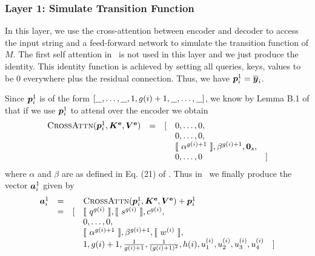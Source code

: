 \subsubsection{Layer 1: Simulate Transition Function}


In this layer, we use the cross-attention between encoder and decoder to access the 
input string and  a feed-forward network to simulate the transition function of $M$.
The first self attention in~ is not used in this layer and 
we just produce the identity.
This identity function is achieved by setting all queries, keys, values to be 0 
everywhere plus the residual connection.
Thus, we have  ${{\bm{p}}}^1_i=\overline{{\bm{y}}}_i$.


Since ${\bm{p}}^1_i$ is of the form $[\lu,\ldots,\lu,1,g(i)+1,\lu,\ldots,\lu]$, we know
by Lemma B.1 of \citet{Perez19} that if we use ${\bm{p}}^1_i$ to attend over the encoder we obtain
\begin{equation*}\label{eq:first-layer2}
\begin{array}{rcllr}
\textsc{CrossAttn}({\bm{p}}^1_i,{\bm{K}}^{\textbf{e}},{\bm{V}}^{\textbf{e}}) & = & [ 
& 0,\ldots,0, \\
&&& 0,\ldots,0, \\
&&& \llbracket\ \alpha^{g(i)+1}\ \rrbracket,\beta^{g(i)+1},{\bm{0}}_s, \\
&&& 0,\ldots,0 & ] 
\end{array}
\end{equation*}
where $\alpha$ and $\beta$ are as defined in Eq. (21) of \citep{Perez19}.
Thus in~ we finally produce the vector ${\bm{a}}^1_i$ given by
\begin{equation}\label{eq:ai_1}
\begin{array}{rcllr}
{\bm{a}}^1_{i} & = &&
\textsc{CrossAttn}({\bm{p}}^1_i,{\bm{K}}^{\textbf{e}},{\bm{V}}^{\textbf{e}}) + {\bm{p}}^1_i \\ 
& = & [ 
& \llbracket\ q^{g(i)}\ \rrbracket,\llbracket\ s^{g(i)}\ \rrbracket,c^{g(i)}, \\
&&& 0,\ldots,0, \\
&&& \llbracket\ \alpha^{g(i)+1}\ \rrbracket,\beta^{g(i)+1},\llbracket\ w^{(i)}\ \rrbracket, \\
&&& 1,g(i)+1,\frac{1}{g(i)+1},\frac{1}{(g(i)+1)^2},h(i),u_1^{(i)},u_2^{(i)},u_3^{(i)},u_4^{(i)} & ] 
\end{array}
\end{equation}


